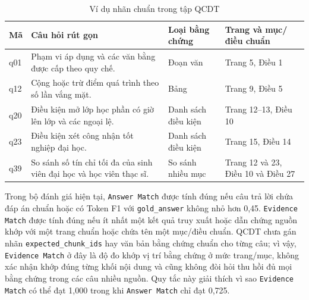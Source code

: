 \documentclass[../DoAn.tex]{subfiles}
\begin{document}
\begin{table}[H]
\centering
\caption{Ví dụ nhãn chuẩn trong tập QCDT}
\label{tab:qcdt-label-examples}

\scriptsize
\begin{tabularx}{\textwidth}{|
>{\centering\arraybackslash}p{}|
>{\raggedright\arraybackslash}X|
>{\raggedright\arraybackslash}p{}|
>{\raggedright\arraybackslash}p{}|
}
\hline
\textbf{Mã} & \textbf{Câu hỏi rút gọn} & \textbf{Loại bằng chứng} & \textbf{Trang và mục/điều chuẩn} \\
\hline
q01 & Phạm vi áp dụng và các văn bằng được cấp theo quy chế. & Đoạn văn & Trang 5, Điều 1 \\
\hline
q12 & Cộng hoặc trừ điểm quá trình theo số lần vắng mặt. & Bảng & Trang 9, Điều 5 \\
\hline
q20 & Điều kiện mở lớp học phần có giờ lên lớp và các ngoại lệ. & Danh sách điều kiện & Trang 12--13, Điều 10 \\
\hline
q23 & Điều kiện xét công nhận tốt nghiệp đại học. & Danh sách điều kiện & Trang 15, Điều 14 \\
\hline
q39 & So sánh số tín chỉ tối đa của sinh viên đại học và học viên thạc sĩ. & So sánh nhiều mục & Trang 12 và 23, Điều 10 và Điều 27 \\
\hline
\end{tabularx}
\end{table}

Trong bộ đánh giá hiện tại, \texttt{Answer Match} được tính đúng nếu câu trả
lời chứa đáp án chuẩn hoặc có Token F1 với \texttt{gold\_answer} không nhỏ hơn
0,45. \texttt{Evidence Match} được tính đúng nếu ít nhất một kết quả truy xuất
hoặc dẫn chứng nguồn khớp với một trang chuẩn hoặc chứa tên một mục/điều chuẩn.
QCDT chưa gán nhãn \texttt{expected\_chunk\_ids} hay văn bản bằng chứng chuẩn
cho từng câu; vì vậy, \texttt{Evidence Match} ở đây là độ đo khớp vị trí bằng
chứng ở mức trang/mục, không xác nhận khớp đúng từng khối nội dung và cũng không
đòi hỏi thu hồi đủ mọi bằng chứng trong các câu nhiều nguồn. Quy tắc này giải
thích vì sao \texttt{Evidence Match} có thể đạt 1,000 trong khi
\texttt{Answer Match} chỉ đạt 0,725.
\end{document}
